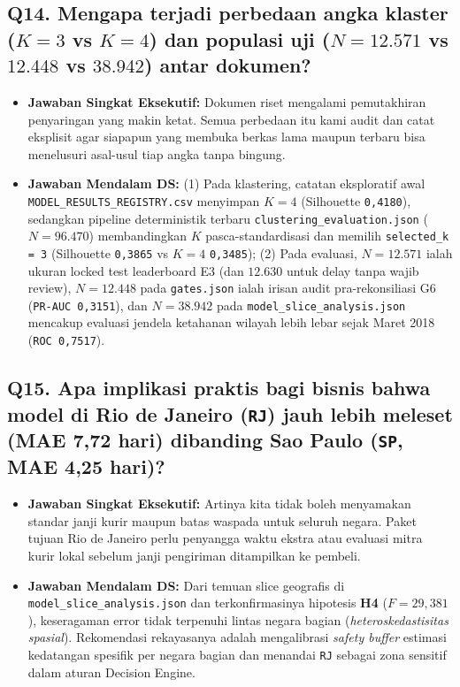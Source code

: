 \documentclass[11pt,a4paper,oneside]{book}
\newcommand{\code}[1]{{\small\nolinkurl{#1}}}
\begin{document}
\subsection*{Q14. Mengapa terjadi perbedaan angka klaster ($K=3$ vs $K=4$) dan populasi uji ($N=12.571$ vs $12.448$ vs $38.942$) antar dokumen?}
\begin{itemize}
  \item \textbf{Jawaban Singkat Eksekutif:} Dokumen riset mengalami pemutakhiran penyaringan yang makin ketat. Semua perbedaan itu kami audit dan catat eksplisit agar siapapun yang membuka berkas lama maupun terbaru bisa menelusuri asal-usul tiap angka tanpa bingung.
  \item \textbf{Jawaban Mendalam DS:} (1) Pada klastering, catatan eksploratif awal \code{MODEL_RESULTS_REGISTRY.csv} menyimpan $K=4$ (Silhouette \code{0,4180}), sedangkan pipeline deterministik terbaru \code{clustering_evaluation.json} ($N=96.470$) membandingkan $K$ pasca-standardisasi dan memilih \code{selected_k = 3} (Silhouette \code{0,3865} vs $K=4$ \code{0,3485}); (2) Pada evaluasi, $N=12.571$ ialah ukuran locked test leaderboard E3 (dan $12.630$ untuk delay tanpa wajib review), $N=12.448$ pada \code{gates.json} ialah irisan audit pra-rekonsiliasi G6 (\code{PR-AUC 0,3151}), dan $N=38.942$ pada \code{model_slice_analysis.json} mencakup evaluasi jendela ketahanan wilayah lebih lebar sejak Maret 2018 (\code{ROC 0,7517}).
\end{itemize}

\subsection*{Q15. Apa implikasi praktis bagi bisnis bahwa model di Rio de Janeiro (\texttt{RJ}) jauh lebih meleset (MAE 7,72 hari) dibanding Sao Paulo (\texttt{SP}, MAE 4,25 hari)?}
\begin{itemize}
  \item \textbf{Jawaban Singkat Eksekutif:} Artinya kita tidak boleh menyamakan standar janji kurir maupun batas waspada untuk seluruh negara. Paket tujuan Rio de Janeiro perlu penyangga waktu ekstra atau evaluasi mitra kurir lokal sebelum janji pengiriman ditampilkan ke pembeli.
  \item \textbf{Jawaban Mendalam DS:} Dari temuan slice geografis di \code{model_slice_analysis.json} dan terkonfirmasinya hipotesis \textbf{H4} ($F = 29{,}381$), keseragaman error tidak terpenuhi lintas negara bagian (\emph{heteroskedastisitas spasial}). Rekomendasi rekayasanya adalah mengalibrasi \emph{safety buffer} estimasi kedatangan spesifik per negara bagian dan menandai \code{RJ} sebagai zona sensitif dalam aturan Decision Engine.
\end{itemize}
\end{document}
